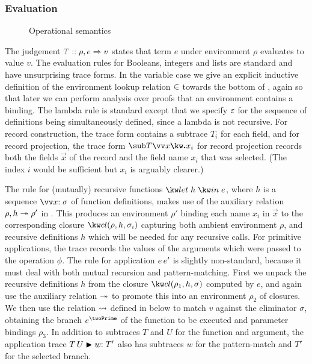 \subsubsection{Evaluation}
\label{sec:core-language:eval}

\begin{figure}
   \vspace{1mm}
   
   
   \caption{Operational semantics}
   \label{fig:core-language:semantics}
\end{figure}



The judgement $\explVal{T}{\rho, e \evalR v}$ states that term $e$ under environment $\rho$ evaluates to value $v$. The evaluation rules for Booleans, integers and lists are standard and have unsurprising trace forms. In the variable case we give an explicit inductive definition of the environment lookup relation $\in$ towards the bottom of , again so that later we can perform analysis over proofs that an environment contains a binding. The lambda rule is standard except that we specify $\varepsilon$ for the sequence of definitions being simultaneously defined, since a lambda is not recursive. For record construction, the trace form contains a subtrace $T_i$ for each field, and for record projection, the trace form $\trRecProj{T}{\vec{x}}{x_i}$ for record projection records both the fields $\vec{x}$ of the record and the field name $x_i$ that was selected. (The index $i$ would be sufficient but $x_i$ is arguably clearer.)

The rule for (mutually) recursive functions $\exLetRecMutual{h}{e}$, where $h$ is a sequence $\vec{\bind{x}{\sigma}}$ of function definitions, makes use of the auxiliary relation $\rho, h \twoheadrightarrow \rho'$ in . This produces an environment $\rho'$ binding each name $x_i$ in $\vec{x}$ to the corresponding closure $\exClosure{\rho}{h}{\sigma_i}$ capturing both ambient environment $\rho$, and recursive definitions $h$ which will be needed for any recursive calls. For primitive applications, the trace records the values of the arguments which were passed to the operation $\phi$. The rule for application ${e}\,{e'}$ is slightly non-standard, because it must deal with both mutual recursion and pattern-matching. First we unpack the recursive definitions $h$ from the closure $\exClosure{\rho_1}{h}{\sigma}$ computed by $e$, and again use the auxiliary relation $\twoheadrightarrow$ to promote this into an environment $\rho_2$ of closures. We then use the relation $\rightsquigarrow$ defined in  below to match $v$ against the eliminator $\sigma$, obtaining the branch $e^\twoPrime$ of the function to be executed and parameter bindings $\rho_3$. In addition to subtraces $T$ and $U$ for the function and argument, the application trace ${T}\,{U} \mathrel{\blacktriangleright} {w{:}\;T'}$ also has subtraces $w$ for the pattern-match and $T'$ for the selected branch.

